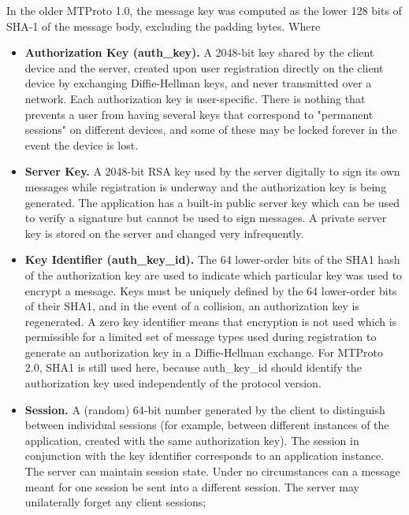 \begin{itemize}
    In the older MTProto 1.0, the message key was computed as the lower 128 bits of SHA-1 of the message body,
    excluding the padding bytes.
    Where
    \begin{itemize}
        \item \textbf{Authorization Key (auth\_key).} A 2048-bit key shared by the client device and the server,
        created upon user registration directly on the client device by exchanging Diffie-Hellman keys, and never
        transmitted over a network.
        Each authorization key is user-specific.
        There is nothing that prevents a user from having several keys that correspond to "permanent sessions"
        on different devices, and some of these may be locked forever in the event the device is lost.
        \item \textbf{Server Key.} A 2048-bit RSA key used by the server digitally to sign its own messages while
        registration is underway and the authorization key is being generated.
        The application has a built-in public server key which can be used to verify a signature but cannot be used
        to sign messages.
        A private server key is stored on the server and changed very infrequently.
        \item \textbf{Key Identifier (auth\_key\_id).} The 64 lower-order bits of the SHA1 hash of the authorization
        key are used to indicate which particular key was used to encrypt a message.
        Keys must be uniquely defined by the 64 lower-order bits of their SHA1, and in the event of a collision,
        an authorization key is regenerated.
        A zero key identifier means that encryption is not used which is permissible for a limited set of message types
        used during registration to generate an authorization key in a Diffie-Hellman exchange.
        For MTProto 2.0, SHA1 is still used here, because auth\_key\_id should identify the authorization key used
        independently of the protocol version.
        \item \textbf{Session.} A (random) 64-bit number generated by the client to distinguish between individual
        sessions (for example, between different instances of the application, created with the same authorization key).
        The session in conjunction with the key identifier corresponds to an application instance.
        The server can maintain session state.
        Under no circumstances can a message meant for one session be sent into a different session.
        The server may unilaterally forget any client sessions;

\end{itemize}
\end{itemize}
